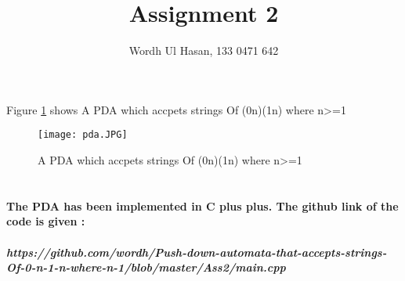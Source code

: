 \documentclass{article}
\title{Assignment 2 }
\author{Wordh Ul Hasan, 133 0471 642}
\date{}
\begin{document}
\maketitle
 

\section{}

Figure \ref{fig:pda} shows A PDA which accpets strings Of (0n)(1n) where n>=1
\begin{figure}
  \texttt{[image: pda.JPG]}
  \caption{A PDA which accpets strings Of (0n)(1n) where n>=1}
  \label{fig:pda}
\end{figure}


\section{}

\paragraph{The PDA has been implemented in C plus plus. The github link of the code is given : }

\subparagraph{https://github.com/wordh/Push-down-automata-that-accepts-strings-Of-0-n-1-n-where-n-1/blob/master/Ass2/main.cpp}


\end{document}
